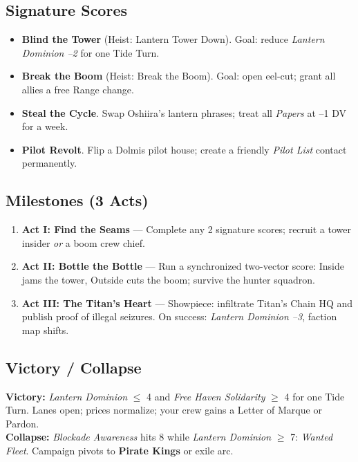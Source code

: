 \documentclass[11pt,oneside]{book}
\begin{document}
\begin{itemize}
\subsection*{Signature Scores}
\begin{itemize}[leftmargin=*,itemsep=2pt]
  \item \textbf{Blind the Tower} (Heist: Lantern Tower Down). Goal: reduce \emph{Lantern Dominion --2} for one Tide Turn.
  \item \textbf{Break the Boom} (Heist: Break the Boom). Goal: open eel-cut; grant all allies a free Range change.
  \item \textbf{Steal the Cycle}. Swap Oshiira's lantern phrases; treat all \emph{Papers} at --1 DV for a week.
  \item \textbf{Pilot Revolt}. Flip a Dolmis pilot house; create a friendly \emph{Pilot List} contact permanently.
\end{itemize}

\subsection*{Milestones (3 Acts)}
\begin{enumerate}[leftmargin=*,itemsep=2pt]
  \item \textbf{Act I: Find the Seams} --- Complete any 2 signature scores; recruit a tower insider \emph{or} a boom crew chief.
  \item \textbf{Act II: Bottle the Bottle} --- Run a synchronized two-vector score: Inside jams the tower, Outside cuts the boom; survive the hunter squadron.
  \item \textbf{Act III: The Titan's Heart} --- Showpiece: infiltrate Titan's Chain HQ and publish proof of illegal seizures. On success: \emph{Lantern Dominion --3}, faction map shifts.
\end{enumerate}

\subsection*{Victory / Collapse}
\textbf{Victory:} \emph{Lantern Dominion} \(\leq\) 4 and \emph{Free Haven Solidarity} \(\geq\) 4 for one Tide Turn. Lanes open; prices normalize; your crew gains a Letter of Marque or Pardon.\\
\textbf{Collapse:} \emph{Blockade Awareness} hits 8 while \emph{Lantern Dominion} \(\geq\) 7: \textit{Wanted Fleet}. Campaign pivots to \textbf{Pirate Kings} or exile arc.


\end{itemize}
\end{document}

